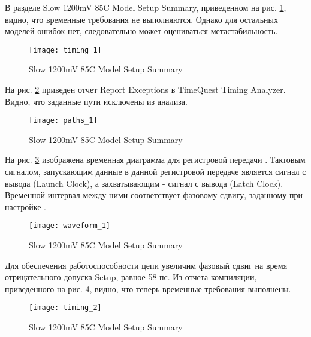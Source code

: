 В разделе Slow 1200mV 85C Model Setup Summary, приведенном на рис. \ref{fig:timing_1}, видно, что временные требования не выполняются. Однако для остальных моделей ошибок нет, следовательно может оцениваться метастабильность.

\begin{figure}[H]
	\begin{center}
		\texttt{[image: timing\_1]}
		\caption{Slow 1200mV 85C Model Setup Summary}
		\label{fig:timing_1}
	\end{center}
\end{figure}

На рис. \ref{fig:paths_1} приведен отчет Report Exceptions в TimeQuest Timing Analyzer. Видно, что заданные пути исключены из анализа. 

\begin{figure}[H]
	\begin{center}
		\texttt{[image: paths\_1]}
		\caption{Slow 1200mV 85C Model Setup Summary}
		\label{fig:paths_1}
	\end{center}
\end{figure}

На рис. \ref{fig:waveform_1} изображена временная диаграмма для регистровой передачи . Тактовым сигналом, запускающим данные в данной регистровой передаче является сигнал с вывода  (Launch Clock), а захватывающим - сигнал с вывода  (Latch Clock). Временной интервал между ними соответствует фазовому сдвигу, заданному при настройке .

\begin{figure}[H]
	\begin{center}
		\texttt{[image: waveform\_1]}
		\caption{Slow 1200mV 85C Model Setup Summary}
		\label{fig:waveform_1}
	\end{center}
\end{figure}

Для обеспечения работоспособности цепи увеличим фазовый сдвиг на время отрицательного допуска Setup, равное 58 пс. Из отчета компиляции, приведенного на рис. \ref{fig:timing_2}, видно, что теперь временные требования выполнены. 

\begin{figure}[H]
	\begin{center}
		\texttt{[image: timing\_2]}
		\caption{Slow 1200mV 85C Model Setup Summary}
		\label{fig:timing_2}
	\end{center}
\end{figure}

